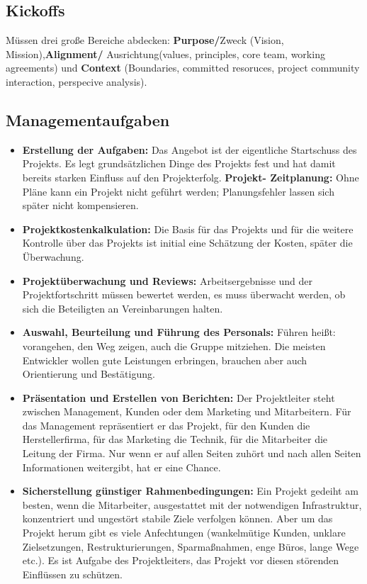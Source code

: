 \documentclass{book}
\begin{document}
    \subsection{Kickoffs}
    Müssen drei große Bereiche abdecken: \newline \textbf{Purpose/}Zweck (Vision, Mission),\newline  \textbf{Alignment/} Ausrichtung(values, principles, core team, working agreements) und  \newline \textbf{Context} (Boundaries, committed resoruces, project community interaction, perspecive analysis).
    \subsection{Managementaufgaben}
    \begin{itemize}
        \item \textbf{Erstellung der Aufgaben:} Das Angebot ist der eigentliche Startschuss des Projekts. Es legt
        grundsätzlichen Dinge des Projekts fest und hat damit bereits starken Einfluss auf den Projekterfolg. \newline
        \textbf{Projekt- Zeitplanung: }\newline Ohne Pläne kann ein Projekt nicht geführt werden; Planungsfehler lassen sich
        später nicht kompensieren.
        \item \textbf{Projektkostenkalkulation: }Die Basis für das Projekts und für die weitere Kontrolle über das Projekts ist
        initial eine Schätzung der Kosten, später die Überwachung.
        \item \textbf{Projektüberwachung und Reviews: } Arbeitsergebnisse und der Projektfortschritt müssen bewertet werden,
        es muss überwacht werden, ob sich die Beteiligten an Vereinbarungen halten.
        \item \textbf{ Auswahl, Beurteilung und Führung des Personals: }Führen heißt: vorangehen, den Weg zeigen, auch die
        Gruppe mitziehen. Die meisten Entwickler wollen gute Leistungen erbringen, brauchen aber auch
        Orientierung und Bestätigung.
        \item \textbf{Präsentation und Erstellen von Berichten: } Der Projektleiter steht zwischen Management, Kunden oder
        dem Marketing und Mitarbeitern. Für das Management repräsentiert er das Projekt, für den Kunden die
        Herstellerfirma, für das Marketing die Technik, für die Mitarbeiter die Leitung der Firma. Nur wenn er auf allen
        Seiten zuhört und nach allen Seiten Informationen weitergibt, hat er eine Chance.
        \item \textbf{Sicherstellung günstiger Rahmenbedingungen: }Ein Projekt gedeiht am besten, wenn die Mitarbeiter,
        ausgestattet mit der notwendigen Infrastruktur, konzentriert und ungestört stabile Ziele verfolgen können.
        Aber um das Projekt herum gibt es viele Anfechtungen (wankelmütige Kunden, unklare Zielsetzungen,
        Restrukturierungen, Sparmaßnahmen, enge Büros, lange Wege etc.). \newline Es ist Aufgabe des Projektleiters, das
        Projekt vor diesen störenden Einflüssen zu schützen.
    \end{itemize}
\end{document}
